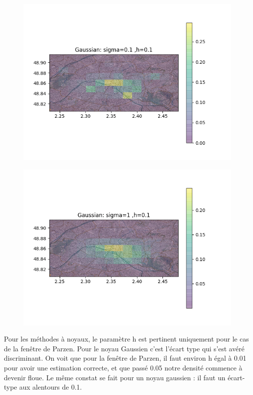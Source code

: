 \documentclass[a4paper]{article}
\begin{document}
\begin{figure}[ht!]
\begin{center}
\begin{minipage}{0.45\textwidth}
\includegraphics[scale=0.5]{Gaussian01.png}
\label{f1_trajectoire}
\end{minipage}\hfill
\begin{minipage}{0.45\textwidth}
\includegraphics[scale=0.5]{Gaussian10.png}
\label{f2_trajectoire}
\end{minipage}
\end{center}
\end{figure}

Pour les méthodes à noyaux, le paramètre h est pertinent uniquement pour le cas de la fenêtre de Parzen. Pour le noyau Gaussien c'est l'écart type qui s'est avéré discriminant. On voit que pour la fenêtre de Parzen, il faut environ h égal à 0.01 pour avoir une estimation correcte, et que passé 0.05 notre densité commence à devenir floue. Le même constat se fait pour un noyau gaussien : il faut un écart-type aux alentours de 0.1.
\end{document}
